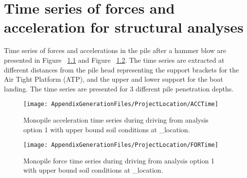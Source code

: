 \chapter{Time series of forces and acceleration for structural analyses}\label{sec_1}

Time series of forces and accelerations in the pile after a hammer blow are presented in Figure 
 ~\ref{Time_Acc} and Figure ~\ref{Time_Force}. The time series are extracted at
different distances from the pile head representing the support brackets for the Air Tight Platform (ATP), and the upper and lower support for the boat landing. 
The time series are presented for 3 different pile penetration depths.


\begin{figure}[!htbp]
\texttt{[image: AppendixGenerationFiles/ProjectLocation/ACCTime]}
\caption{Monopile acceleration time series during driving from analysis option 1 with upper bound soil conditions at {\ID_location}.}
\label{Time_Acc}\end{figure}

\newpage
\begin{figure}[!htbp]
\texttt{[image: AppendixGenerationFiles/ProjectLocation/FORTime]}
\caption{Monopile force time series during driving from analysis option 1 with upper bound soil conditions at {\ID_location}.}
\label{Time_Force}\end{figure}




